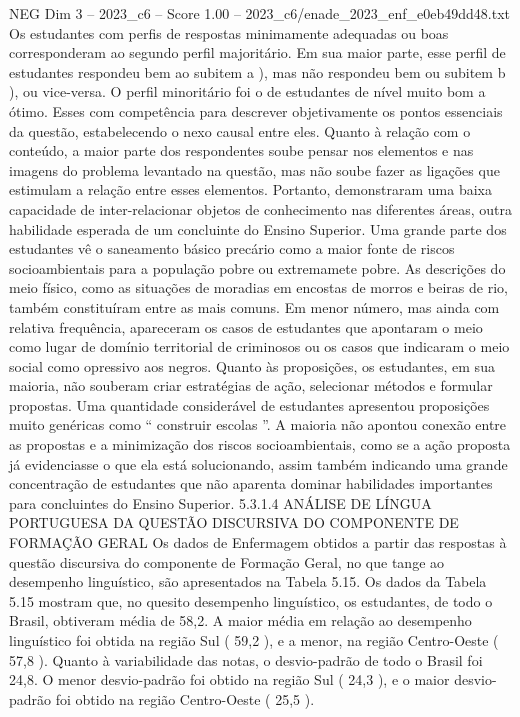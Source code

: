 \begin{textsample}{NEG Dim 3 – 2023\_c6 – Score 1.00 – 2023\_c6/enade\_2023\_enf\_e0eb49dd48.txt}
Os estudantes com perfis de respostas minimamente adequadas ou boas corresponderam ao segundo perfil majoritário.
Em sua maior parte, esse perfil de estudantes respondeu bem ao subitem a ), mas não respondeu bem ou subitem b ), ou vice-versa.
O perfil minoritário foi o de estudantes de nível muito bom a ótimo.
Esses com competência para descrever objetivamente os pontos essenciais da questão, estabelecendo o nexo causal entre eles.
Quanto à relação com o conteúdo, a maior parte dos respondentes soube pensar nos elementos e nas imagens do problema levantado na questão, mas não soube fazer as ligações que estimulam a relação entre esses elementos.
Portanto, demonstraram uma baixa capacidade de inter-relacionar objetos de conhecimento nas diferentes áreas, outra habilidade esperada de um concluinte do Ensino Superior.
Uma grande parte dos estudantes vê o saneamento básico precário como a maior fonte de riscos socioambientais para a população pobre ou extremamete pobre.
As descrições do meio físico, como as situações de moradias em encostas de morros e beiras de rio, também constituíram entre as mais comuns.
Em menor número, mas ainda com relativa frequência, apareceram os casos de estudantes que apontaram o meio como lugar de domínio territorial de criminosos ou os casos que indicaram o meio social como opressivo aos negros.
Quanto às proposições, os estudantes, em sua maioria, não souberam criar estratégias de ação, selecionar métodos e formular propostas.
Uma quantidade considerável de estudantes apresentou proposições muito genéricas como “ construir escolas ”.
A maioria não apontou conexão entre as propostas e a minimização dos riscos socioambientais, como se a ação proposta já evidenciasse o que ela está solucionando, assim também indicando uma grande concentração de estudantes que não aparenta dominar habilidades importantes para concluintes do Ensino Superior. 5.3.1.4 ANÁLISE DE LÍNGUA PORTUGUESA DA QUESTÃO DISCURSIVA DO COMPONENTE DE FORMAÇÃO GERAL Os dados de Enfermagem obtidos a partir das respostas à questão discursiva do componente de Formação Geral, no que tange ao desempenho linguístico, são apresentados na Tabela 5.15.
Os dados da Tabela 5.15 mostram que, no quesito desempenho linguístico, os estudantes, de todo o Brasil, obtiveram média de 58,2.
A maior média em relação ao desempenho linguístico foi obtida na região Sul ( 59,2 ), e a menor, na região Centro-Oeste ( 57,8 ).
Quanto à variabilidade das notas, o desvio-padrão de todo o Brasil foi 24,8.
O menor desvio-padrão foi obtido na região Sul ( 24,3 ), e o maior desvio-padrão foi obtido na região Centro-Oeste ( 25,5 ).

\end{textsample}
